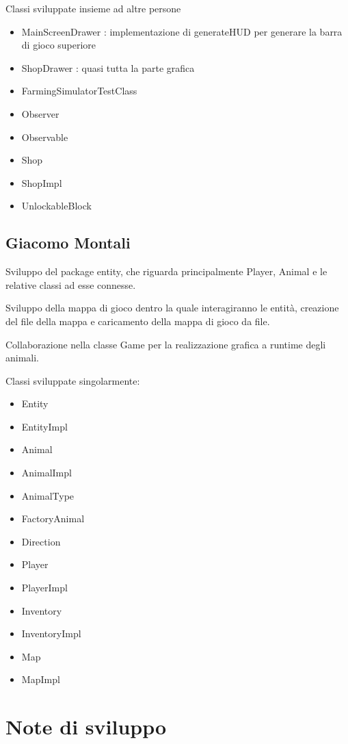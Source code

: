 \documentclass[a4paper,12pt]{report}
\begin{document}
Classi sviluppate insieme ad altre persone
{
\begin{itemize}
	\item MainScreenDrawer : implementazione di generateHUD per generare la barra di gioco superiore
	\item ShopDrawer : quasi tutta la parte grafica
	\item FarmingSimulatorTestClass 
	\item Observer
	\item Observable
	\item Shop
	\item ShopImpl
	\item UnlockableBlock
\end{itemize}
}

\subsection{Giacomo Montali}
Sviluppo del package entity, che riguarda principalmente Player, Animal e le relative classi ad esse connesse.

Sviluppo della mappa di gioco dentro la quale interagiranno le entità, creazione del file della mappa e caricamento della mappa di gioco da file. 

Collaborazione nella classe Game per la realizzazione grafica a runtime degli animali.

Classi sviluppate singolarmente:
{
\begin{itemize}
	\item Entity
	\item EntityImpl
	\item Animal
	\item AnimalImpl
	\item AnimalType
	\item FactoryAnimal
	\item Direction
	\item Player
	\item PlayerImpl
	\item Inventory
	\item InventoryImpl
	\item Map
	\item MapImpl
\end{itemize}
}


\section{Note di sviluppo}
\end{document}
